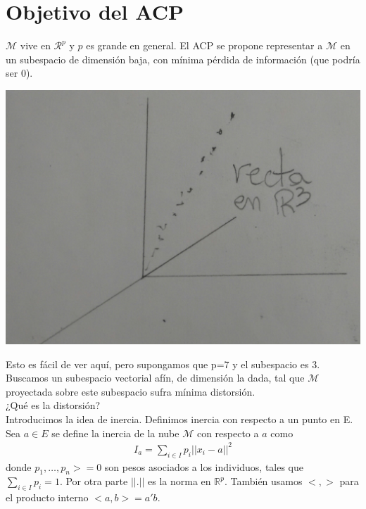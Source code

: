 \documentclass[10pt]{article}
\theoremstyle{plain}
\theoremstyle{definition}
\begin{document}
\section{Objetivo del ACP}
$\mathcal{M}$ vive en $\mathcal{R}^p$ y $p$ es grande en general. El ACP se propone representar a $\mathcal{M}$ en un subespacio de dimensión baja, con mínima pérdida de información (que podría ser 0).
\begin{center}
\includegraphics[scale=0.1]{imagenes/rectaenr3.jpg}
\end{center}

Esto es fácil de ver aquí, pero supongamos que p=7 y el subespacio es 3.\\

Buscamos un subespacio vectorial afín, de dimensión la dada, tal que $\mathcal{M}$ proyectada sobre este subespacio sufra mínima distorsión.\\

¿Qué es la distorsión?\\

Introducimos la idea de inercia.
Definimos inercia con respecto a un punto en E.\\

Sea $a\in E$ se define la inercia de la nube $\mathcal{M}$ con respecto a $a$ como
\begin{align*}
I_{a} = \sum_{i \in I} p_{i}||x_{i}-a||^2
\end{align*}
donde $p_{1}, \ldots, p_{n} >= 0$ son pesos asociados a los individuos, tales que $\sum_{i\in I} p_{i} = 1$. Por otra parte $||.||$ es la norma en $\mathbb{R}^p$. También usamos $<,>$ para el producto interno $<a,b> = a'b$.\\
\end{document}
